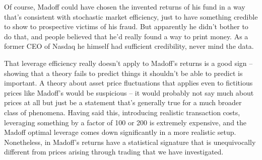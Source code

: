 Of course, Madoff could have chosen the invented returns of his fund in a way that's consistent with stochastic market efficiency, just to have something credible to show to prospective victims of his fraud. But apparently he didn't bother to do that, and people believed that he'd really found a way to print money. As a former CEO of Nasdaq he himself had sufficient credibility, never mind the data.

That leverage efficiency really doesn't apply to Madoff's returns is a good sign -- showing that a theory fails to predict things it shouldn't be able to predict is important. A theory about asset price fluctuations that applies even to fictitious prices like Madoff's would be suspicious -- it would probably not say much about prices at all but just be a statement that's generally true for a much broader class of phenomena. Having said this, introducing realistic transaction costs, leveraging something by a factor of 100 or 200 is extremely expensive, and the Madoff optimal leverage comes down significantly in a more realistic setup. Nonetheless, in  Madoff's returns have a statistical signature that is unequivocally different from prices arising through trading that we have investigated.

